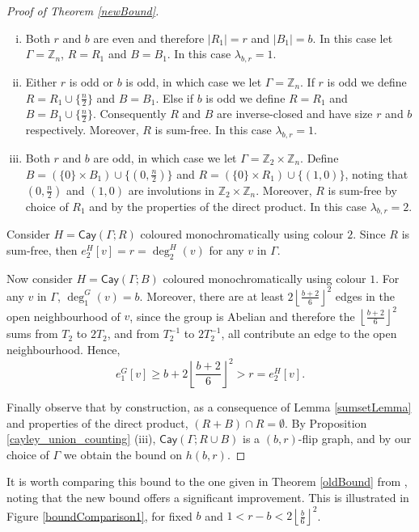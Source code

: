 \documentclass[a4paper,12pt]{article}
\newcommand{\cay}[2]{\mathsf{Cay}\left(#1 ; #2\right)}
\begin{document}
\begin{proof}[Proof of Theorem \ref{newBound}]
	\begin{enumerate}[i.]
		\item Both $r$ and $b$ are even and therefore $|R_1| = r$ and $|B_1| = b$. In this case let $\Gamma = \mathbb{Z}_n$, $R = R_1$ and $B = B_1$. In this case $\lambda_{b,r} = 1$. 
		\item Either $r$ is odd or $b$ is odd, in which case we let $\Gamma = \mathbb{Z}_n$. If $r$ is odd we define $R = R_1 \cup \{\frac{n}{2}\}$ and $B = B_1$. Else if $b$ is odd we define $R = R_1$ and $B = B_1 \cup \{\frac{n}{2}\}$. Consequently $R$ and $B$ are inverse-closed and have size $r$ and $b$ respectively. Moreover, $R$ is sum-free. In this case $\lambda_{b,r} = 1$. 
		\item Both $r$ and $b$ are odd, in which case we let $\Gamma = \mathbb{Z}_2 \times \mathbb{Z}_n$. Define $B = \left(\{0\} \times B_1\right) \cup \{(0, \frac{n}{2})\}$ and $R = \left(\{0\} \times R_1\right) \cup \{(1,0)\}$, noting that $(0, \frac{n}{2})$ and $(1, 0)$ are involutions in $\mathbb{Z}_2 \times \mathbb{Z}_n$. Moreover, $R$ is sum-free by choice of $R_1$ and by the properties of the direct product. In this case $\lambda_{b,r} = 2$.
	\end{enumerate}  
 	 
 	Consider $H = \cay{\Gamma}{R}$ coloured monochromatically using colour $2$. Since $R$ is sum-free, then $e_2^H [v] = r = \deg^H_2 (v)$ for any $v$ in $\Gamma$.
 
 	Now consider $H = \cay{\Gamma}{B}$ coloured monochromatically using colour $1$. For any $v$ in $\Gamma$, $\deg_1^G (v) = b$. Moreover, there are at least $2 \left\lfloor\frac{b+2}{6}\right\rfloor^2$ edges in the open neighbourhood of $v$, since the group is Abelian and therefore the $\left\lfloor\frac{b+2}{6}\right\rfloor^2$ sums from $T_2$ to $2T_2$, and from $T_2^{-1}$ to $2T_2^{-1}$, all contribute an edge to the open neighbourhood. Hence, $$e_1^G [v] \geq b + 2\left\lfloor\frac{b+2}{6}\right\rfloor^2 > r = e_2^H [v].$$
 
 	Finally observe that by construction, as a consequence of Lemma \ref{sumsetLemma} and properties of the direct product, $(R + B) \cap R = \emptyset$. By Proposition \ref{cayley_union_counting} (iii), $\cay{\Gamma}{R \cup B}$ is a $(b, r)$-flip graph, and by our choice of $\Gamma$ we obtain the bound on $h(b, r)$.
\end{proof}

It is worth comparing this bound to the one given in Theorem \ref{oldBound} from \cite{caro2023flip}, noting that the new bound offers a significant improvement. This is illustrated in Figure \ref{boundComparison1}, for fixed $b$ and $1 < r - b < 2 \left \lfloor\frac{b}{6}\right\rfloor^2$.
\end{document}
